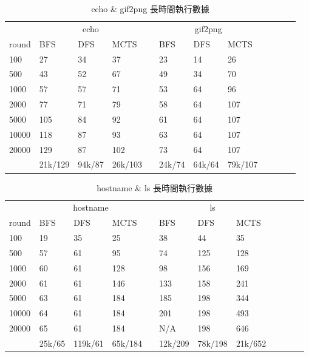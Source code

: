 \documentclass[12pt,a4paper,oneside]{book}
\begin{document}
\begin{appendices}
\begin{table}[htbp]
\centering
\caption{echo \& gif2png 長時間執行數據}
\label{large2}
\begin{tabular}{@{}llllllllllll@{}} \toprule
             & \multicolumn{3}{c}{echo} & \phantom{abc} & \multicolumn{3}{c}{gif2png} \\ \cmidrule{2-4} \cmidrule{6-8}
round      & BFS   & DFS  & MCTS & & BFS   & DFS & MCTS     \\ \midrule
100        & 27    & 34   & 37   & & 23    & 14  & 26       \\
500        & 43    & 52   & 67   & & 49    & 34  & 70       \\
1000       & 57    & 57   & 71   & & 53    & 64  & 96       \\
2000       & 77    & 71   & 79   & & 58    & 64  & 107      \\
5000       & 105   & 84   & 92   & & 61    & 64  & 107      \\
10000      & 118   & 87   & 93   & & 63    & 64  & 107      \\
20000      & 129   & 87   & 102  & & 73    & 64  & 107      \\
& 21k/129 & 94k/87 & 26k/103 & & 24k/74 & 64k/64 & 79k/107  \\ \bottomrule
\end{tabular}
\end{table}

\begin{table}[htbp]
\centering
\caption{hostname \& ls 長時間執行數據}
\label{large3}
\begin{tabular}{@{}llllllllllll@{}} \toprule
             & \multicolumn{3}{c}{hostname} & \phantom{abc} & \multicolumn{3}{c}{ls} \\ \cmidrule{2-4} \cmidrule{6-8}
round      & BFS   & DFS  & MCTS & & BFS   & DFS & MCTS     \\ \midrule
100        & 19    & 35   & 25   & & 38    & 44  & 35       \\
500        & 57    & 61   & 95   & & 74    & 125 & 128      \\
1000       & 60    & 61   & 128  & & 98    & 156 & 169      \\
2000       & 61    & 61   & 146  & & 133   & 158 & 241      \\
5000       & 63    & 61   & 184  & & 185   & 198 & 344      \\
10000      & 64    & 61   & 184  & & 201   & 198 & 493      \\
20000      & 65    & 61   & 184  & & N/A   & 198 & 646      \\ 
& 25k/65 & 119k/61 & 65k/184 & & 12k/209 & 78k/198 & 21k/652 \\ \bottomrule
\end{tabular}
\end{table}


\end{appendices}
\end{document}
